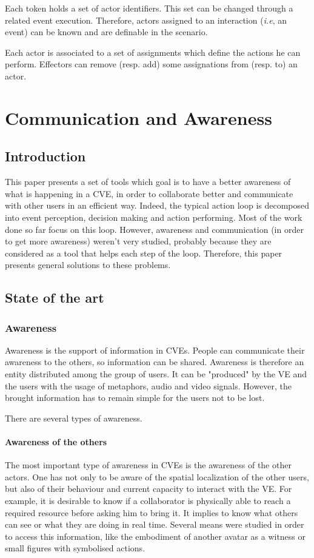 \documentclass[a4paper]{article}
\begin{document}
Each token holds a set of actor identifiers. This set can be changed through a related event execution. Therefore, actors assigned to an interaction (\textit{i.e}, an event) can be known and are definable in the scenario.

Each actor is associated to a set of assignments which define the actions he can perform. Effectors can remove (resp. add) some assignations from (resp. to) an actor. 

\section{Communication and Awareness}

\subsection{Introduction}
This paper presents a set of tools which goal is to have a better awareness of what is happening in a CVE, in order to collaborate better and communicate with other users in an efficient way. Indeed, the typical action loop is decomposed into event perception, decision making and action performing. Most of the work done so far focus on this loop. However, awareness and communication (in order to get more awareness) weren't very studied, probably because they are considered as a tool that helps each step of the loop. Therefore, this paper presents general solutions to these problems.

\subsection{State of the art}

\subsubsection{Awareness}
Awareness is the support of information in CVEs. People can communicate their awareness to the others, so information can be shared. Awareness is therefore an entity distributed among the group of users. It can be "produced" by the VE and the users with the usage of metaphors, audio and video signals. However, the brought information has to remain simple for the users not to be lost.

There are several types of awareness.

\paragraph{Awareness of the others}
The most important type of awareness in CVEs is the awareness of the other actors. One has not only to be aware of the spatial localization of the other users, but also of their behaviour and current capacity to interact with the VE. For example, it is desirable to know if a collaborator is physically able to reach a required resource before asking him to bring it. It implies to know what others can see or what they are doing in real time. Several means were studied in order to access this information, like the embodiment of another avatar as a witness or small figures with symbolised actions.
\end{document}
